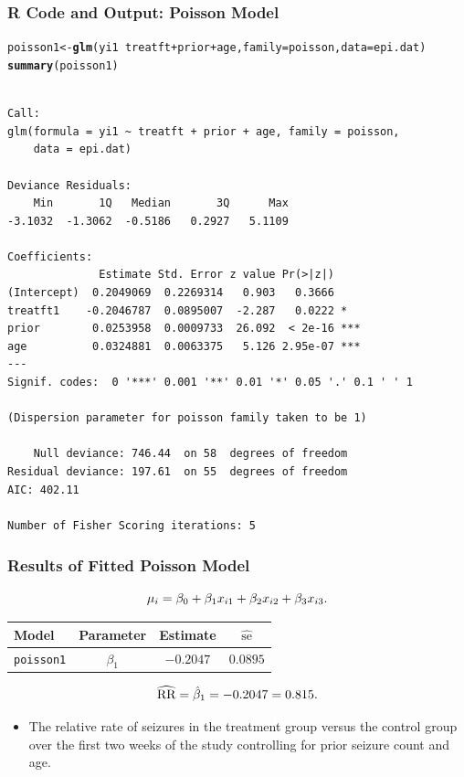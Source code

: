 \documentclass[oneside]{book}\usepackage[]{graphicx}\usepackage[svgnames]{xcolor}
\makeatletter
\newcommand{\hlopt}[1]{\textcolor[rgb]{0,0,0}{#1}}%
\newcommand{\hlstd}[1]{\textcolor[rgb]{0.345,0.345,0.345}{#1}}%
\newcommand{\hlkwb}[1]{\textcolor[rgb]{0.69,0.353,0.396}{#1}}%
\newcommand{\hlkwc}[1]{\textcolor[rgb]{0.333,0.667,0.333}{#1}}%
\newcommand{\hlkwd}[1]{\textcolor[rgb]{0.737,0.353,0.396}{\textbf{#1}}}%
\newenvironment{kframe}{%
 \def\at@end@of@kframe{}%
 \ifinner\ifhmode%
  \def\at@end@of@kframe{\end{minipage}}%
  \begin{minipage}{\columnwidth}%
 \fi\fi%
 \def\FrameCommand##1{\hskip\@totalleftmargin \hskip-\fboxsep
 \colorbox{shadecolor}{##1}\hskip-\fboxsep
     \hskip-\linewidth \hskip-\@totalleftmargin \hskip\columnwidth}%
 \MakeFramed {\advance\hsize-\width
   \@totalleftmargin\z@ \linewidth\hsize
   \@setminipage}}%
 {\par\unskip\endMakeFramed%
 \at@end@of@kframe}
\newenvironment{knitrout}{}{} %
\let\exp\relax%
\let\log\relax%
\newcommand{\RR}{\text{RR}}%
\makeatother
\begin{document}
\subsubsection*{R Code and Output: Poisson Model}
\begin{knitrout}
\color{fgcolor}\begin{kframe}
\begin{alltt}
\hlstd{poisson1} \hlkwb{<-} \hlkwd{glm}\hlstd{(yi1} \hlopt{~} \hlstd{treatft} \hlopt{+} \hlstd{prior} \hlopt{+} \hlstd{age,} \hlkwc{family} \hlstd{= poisson,} \hlkwc{data} \hlstd{= epi.dat)}
\hlkwd{summary}\hlstd{(poisson1)}
\end{alltt}
\begin{verbatim}

Call:
glm(formula = yi1 ~ treatft + prior + age, family = poisson, 
    data = epi.dat)

Deviance Residuals: 
    Min       1Q   Median       3Q      Max  
-3.1032  -1.3062  -0.5186   0.2927   5.1109  

Coefficients:
              Estimate Std. Error z value Pr(>|z|)    
(Intercept)  0.2049069  0.2269314   0.903   0.3666    
treatft1    -0.2046787  0.0895007  -2.287   0.0222 *  
prior        0.0253958  0.0009733  26.092  < 2e-16 ***
age          0.0324881  0.0063375   5.126 2.95e-07 ***
---
Signif. codes:  0 '***' 0.001 '**' 0.01 '*' 0.05 '.' 0.1 ' ' 1

(Dispersion parameter for poisson family taken to be 1)

    Null deviance: 746.44  on 58  degrees of freedom
Residual deviance: 197.61  on 55  degrees of freedom
AIC: 402.11

Number of Fisher Scoring iterations: 5
\end{verbatim}
\end{kframe}
\end{knitrout}
\subsubsection*{Results of Fitted Poisson Model}
\[ \log{\mu_i}=\beta_0+\beta_1x_{i1}+\beta_2x_{i2}+\beta_3x_{i3}. \]
\begin{table}[H]
      \centering
      \begin{tabular}{lccc}
            Model             & Parameter   & Estimate    & $ \widehat{\text{se}} $ \\
            \midrule
            \texttt{poisson1} & $ \beta_1 $ & $ -0.2047 $ & $ 0.0895 $              \\
            \bottomrule
      \end{tabular}
\end{table}
\[ \widehat{\RR}=\exp{\hat{\beta}_1}=\exp{-0.2047}=0.815. \]
\begin{itemize}
      \item The relative rate of seizures in the treatment group versus the control group over
            the first two weeks of the study controlling for prior seizure count and age.
\end{itemize}
\end{document}

